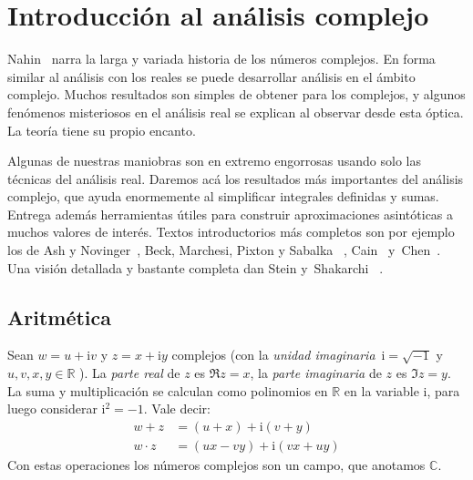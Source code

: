 %

\chapter{Introducción al análisis complejo}
\label{cha:analisis-complejo}

  Nahin~\cite{nahin10:_imaginary_tale}
  narra la larga y variada historia de los números complejos.
  En forma similar al análisis con los reales
  se puede desarrollar análisis en el ámbito complejo.
  Muchos resultados son simples de obtener para los complejos,
  y algunos fenómenos misteriosos en el análisis real
  se explican al observar desde esta óptica.
  La teoría tiene su propio encanto.

  Algunas de nuestras maniobras
  son en extremo engorrosas
  usando solo las técnicas del análisis real.
  Daremos acá los resultados más importantes del análisis complejo,
  que ayuda enormemente al simplificar integrales definidas
  y sumas.
  Entrega además herramientas útiles
  para construir aproximaciones asintóticas
  a muchos valores de interés.
  Textos introductorios más completos son por ejemplo los de
  Ash y Novinger~\cite{ash07:_complex_variables},
  Beck, Marchesi, Pixton y Sabalka~%
    \cite{beck12:_first_course_compl_analysis},
  Cain~\cite{cain01:_compl_analy}
  y~Chen~\cite{chen08:_intro_complex_anal}.
  Una visión detallada y bastante completa dan Stein y~Shakarchi~%
    \cite{stein10:_compl_analy}.

\section{Aritmética}
\label{sec:aritmetica-complejos}

  Sean \(w = u + \mathrm{i} v\) y \(z = x + \mathrm{i} y\) complejos
  (con la \emph{unidad imaginaria}\, \(\mathrm{i} = \sqrt{-1}\)%
   y \(u, v, x, y \in \mathbb{R}\) ).
  La \emph{parte real} de \(z\) es \(\Re z = x\),%
  la \emph{parte imaginaria} de \(z\) es \(\Im z = y\).%
  La suma y multiplicación
  se calculan como polinomios en \(\mathbb{R}\)
  en la variable \(\mathrm{i}\),
  para luego considerar \(\mathrm{i}^2 = -1\).
  Vale decir:
  \begin{align*}
    w + z
      &= (u + x) + \mathrm{i} (v + y) \\
    w \cdot z
      &= (u x - v y) + \mathrm{i} (v x + u y)
  \end{align*}
  Con estas operaciones los números complejos
  son un campo,%
  que anotamos \(\mathbb{C}\).

